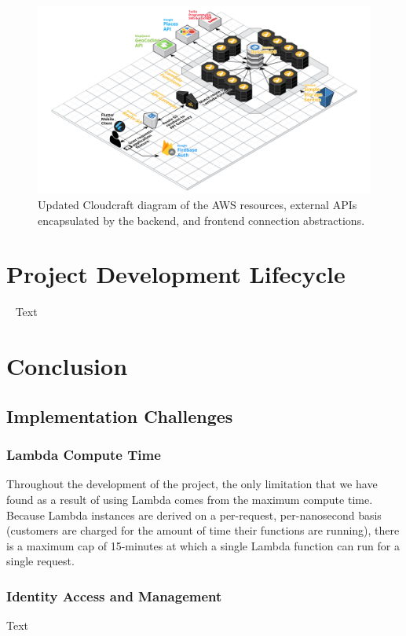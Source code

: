 \documentclass[10pt, a4paper]{article}
\begin{document}
\begin{figure}[H]
\begin{center}
\centerline{
	\includegraphics[scale=.2]{EmergenSeek-Backend.PNG}
}
\caption{Updated Cloudcraft diagram of the AWS resources, external APIs encapsulated by the backend, and frontend connection abstractions.}
\end{center}	
\end{figure}

\section{Project Development Lifecycle} 
\label{sec:pdl}
\par ~ Text 

\section{Conclusion}

\subsection{Implementation Challenges}
\subsubsection{Lambda Compute Time}
Throughout the development of the project, the only limitation that we have found as a result of using Lambda comes from the maximum compute time. Because Lambda instances are derived on a per-request, per-nanosecond basis (customers are charged for the amount of time their functions are running), there is a maximum cap of 15-minutes at which a single Lambda function can run for a single request.
\subsubsection{Identity Access and Management}
Text
\end{document}
